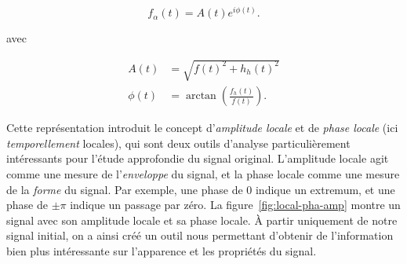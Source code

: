 \begin{equation}
    f_{\alpha} (t) = A(t)e^{i\phi(t)}.
\end{equation}

avec 

\begin{align}
    A(t) &= \sqrt{f(t)^2 + h_h(t)^2} \\
    \phi(t) &= \arctan\left(\frac{f_h(t)}{f(t)}\right).
\end{align}

Cette représentation introduit le concept d'\textit{amplitude locale} et de \textit{phase locale} (ici \textit{temporellement} locales), qui sont deux outils d'analyse particulièrement intéressants pour l'étude approfondie du signal original. L'amplitude locale agit comme une mesure de l'\textit{enveloppe} du signal, et la phase locale comme une mesure de la \textit{forme} du signal. Par exemple, une phase de $0$ indique un extremum, et une phase de $\pm\pi$ indique un passage par zéro. La figure~\ref{fig:local-pha-amp} montre un signal avec son amplitude locale et sa phase locale. À partir uniquement de notre signal initial, on a ainsi créé un outil nous permettant d'obtenir de l'information bien plus intéressante sur l'apparence et les propriétés du signal.

